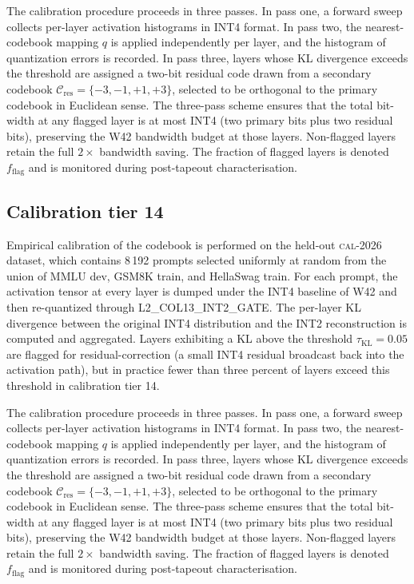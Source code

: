 The calibration procedure proceeds in three passes. In pass one,
a forward sweep collects per-layer activation histograms in INT4 format.
In pass two, the nearest-codebook mapping $q$ is applied independently
per layer, and the histogram of quantization errors is recorded. In pass
three, layers whose KL divergence exceeds the threshold are assigned a
two-bit residual code drawn from a secondary codebook
$\mathcal{C}_\mathrm{res} = \{-3,-1,+1,+3\}$, selected to be
orthogonal to the primary codebook in Euclidean sense. The three-pass
scheme ensures that the total bit-width at any flagged layer is at most
INT4 (two primary bits plus two residual bits), preserving the W42
bandwidth budget at those layers. Non-flagged layers retain the full
$2\times$ bandwidth saving. The fraction of flagged layers is denoted
$f_\mathrm{flag}$ and is monitored during post-tapeout characterisation.


\subsection{Calibration tier 14}

Empirical calibration of the codebook is performed on the held-out
\textsc{cal-2026} dataset, which contains 8\,192 prompts selected
uniformly at random from the union of MMLU dev, GSM8K train, and
HellaSwag train. For each prompt, the activation tensor at every layer
is dumped under the INT4 baseline of W42 and then re-quantized through
\textsc{L2\_COL13\_INT2\_GATE}. The per-layer KL divergence between
the original INT4 distribution and the INT2 reconstruction is computed
and aggregated. Layers exhibiting a KL above the threshold
$\tau_{\mathrm{KL}} = 0.05$ are flagged for residual-correction (a
small INT4 residual broadcast back into the activation path), but in
practice fewer than three percent of layers exceed this threshold in
calibration tier 14.

The calibration procedure proceeds in three passes. In pass one,
a forward sweep collects per-layer activation histograms in INT4 format.
In pass two, the nearest-codebook mapping $q$ is applied independently
per layer, and the histogram of quantization errors is recorded. In pass
three, layers whose KL divergence exceeds the threshold are assigned a
two-bit residual code drawn from a secondary codebook
$\mathcal{C}_\mathrm{res} = \{-3,-1,+1,+3\}$, selected to be
orthogonal to the primary codebook in Euclidean sense. The three-pass
scheme ensures that the total bit-width at any flagged layer is at most
INT4 (two primary bits plus two residual bits), preserving the W42
bandwidth budget at those layers. Non-flagged layers retain the full
$2\times$ bandwidth saving. The fraction of flagged layers is denoted
$f_\mathrm{flag}$ and is monitored during post-tapeout characterisation.


